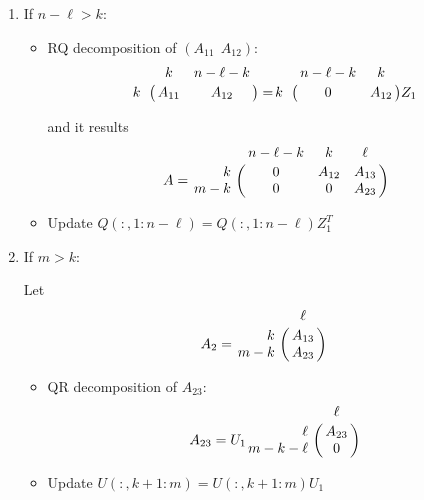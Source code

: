 \begin{enumerate}[{\rm Step 1}(1)]
\item If $n-\ell > k$:
\begin{itemize}
\item RQ decomposition of $(A_{11} \ \ A_{12})$:
\begin{equation} \label{alg-step-1-9a} 
    \bordermatrix{ & k & n-\ell-k \cr
    \hfill k & A_{11} & A_{12} \cr}
    = \bordermatrix{ & n-\ell-k & k \cr
    \hfill k & 0 & A_{12} \cr}Z_{1}
\end{equation}

and it results 
\begin{equation} \label{alg-step-1-9b} 
A = \bordermatrix{ 
           & n-\ell-k & k  & \ell \cr
\hfill k   & 0 & A_{12} & A_{13} \cr
\hfill m-k & 0      & 0      & A_{23} \cr}
\end{equation}

\item Update $Q(:,1:n-\ell) = Q(:, 1:n-\ell) Z_{1}^{T}$
\end{itemize}

\item If $m > k$:

Let 
\begin{equation} \label{alg-step-1-10a} 
    A_{2} = \bordermatrix{ & \ell  \cr
    \hfill k & A_{13}  \cr
    \hfill m-k & A_{23} \cr}
\end{equation}
\begin{itemize}
\item QR decomposition of $A_{23}$:
\begin{equation} \label{alg-step-1-10b} 
    A_{23} = U_{1}\bordermatrix{ & \ell  \cr
    \hfill \ell & A_{23}  \cr
    \hfill m-k-\ell & 0 \cr}
\end{equation}
\item Update $U(:,k+1:m) = U(:,k+1:m)U_{1}$
\end{itemize}    
\end{enumerate}

